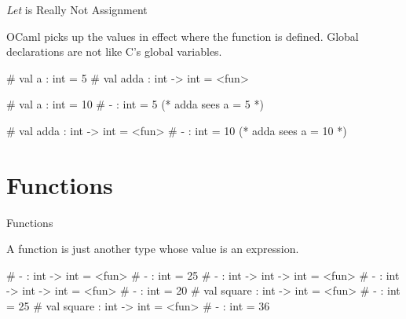 \documentclass{plt}
\begin{document}
\begin{frame}[fragile]{\emph{Let} is Really Not Assignment}

OCaml picks up the values in effect where the function
is defined.
\alert{Global declarations are not like C's global variables.}

\begin{interactive}
# 
val a : int = 5
# 
val adda : int -> int = <fun>

# 
val a : int = 10
# 
- : int = 5        \alert{(* adda sees a = 5 *)}

# 
val adda : int -> int = <fun>
# 
- : int = 10       \alert{(* adda sees a = 10 *)}
\end{interactive}

\end{frame}

\part{Functions}

\begin{frame}[fragile]{Functions}

  A function is just another type whose value is an
  expression.

\begin{interactive}
# 
- : int -> int = <fun>
# 
- : int = 25
# 
- : int -> int -> int = <fun>
# 
- : int -> int -> int = <fun>
# 
- : int = 20
# 
val square : int -> int = <fun>
# 
- : int = 25
# 
val square : int -> int = <fun>
# 
- : int = 36
\end{interactive}
\end{frame}

\end{document}
